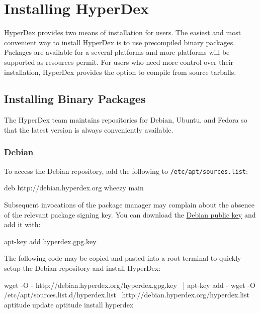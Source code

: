 \chapter{Installing HyperDex}
\label{chap:installation}

HyperDex provides two means of installation for users.  The easiest and most
convenient way to install HyperDex is to use precompiled binary packages.
Packages are available for a several platforms and more platforms will be
supported as resources permit.  For users who need more control over their
installation, HyperDex provides the option to compile from source tarballs.

\section{Installing Binary Packages}
\label{sec:installation:binaries}

The HyperDex team maintains repositories for Debian, Ubuntu, and Fedora so that
the latest version is always conveniently available.

\subsection{Debian}
\label{sec:installation:binaries:debian}

To access the Debian repository, add the following to
\texttt{/etc/apt/sources.list}:

\begin{consolecode}
deb http://debian.hyperdex.org wheezy main
\end{consolecode}

Subsequent invocations of the package manager may complain about the absence of
the relevant package signing key.  You can download the
\href{http://debian.hyperdex.org/hyperdex.gpg.key}{Debian public key} and add
it with:

\begin{consolecode}
apt-key add hyperdex.gpg.key
\end{consolecode}

The following code may be copied and pasted into a root terminal to quickly
setup the Debian repository and install HyperDex:

\begin{consolecode}
wget -O - http://debian.hyperdex.org/hyperdex.gpg.key \
| apt-key add -
wget -O /etc/apt/sources.list.d/hyperdex.list \
    http://debian.hyperdex.org/hyperdex.list
aptitude update
aptitude install hyperdex
\end{consolecode}

